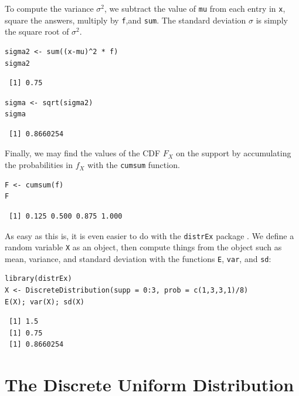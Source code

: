 \documentclass[captions=tableheading]{scrbook}
\begin{document}
To compute the variance \(\sigma^{2}\), we subtract the value of \texttt{mu} from each entry in \texttt{x}, square the answers, multiply by \texttt{f},and \texttt{sum}. The standard deviation \(\sigma\) is simply the square root of \(\sigma^{2}\).


\begin{verbatim}
sigma2 <- sum((x-mu)^2 * f)
sigma2
\end{verbatim}

\begin{verbatim}
 [1] 0.75
\end{verbatim}


\begin{verbatim}
sigma <- sqrt(sigma2)
sigma
\end{verbatim}

\begin{verbatim}
 [1] 0.8660254
\end{verbatim}

Finally, we may find the values of the CDF \(F_{X}\) on the support by accumulating the probabilities in \(f_{X}\) with the \texttt{cumsum} function. 


\begin{verbatim}
F <- cumsum(f)
F
\end{verbatim}

\begin{verbatim}
 [1] 0.125 0.500 0.875 1.000
\end{verbatim}

As easy as this is, it is even easier to do with the \texttt{distrEx} package \cite{Ruckdescheldistr}. We define a random variable \texttt{X} as an object, then compute things from the object such as mean, variance, and standard deviation with the functions \texttt{E}, \texttt{var}, and \texttt{sd}:


\begin{verbatim}
library(distrEx)
X <- DiscreteDistribution(supp = 0:3, prob = c(1,3,3,1)/8)
E(X); var(X); sd(X)
\end{verbatim}

\begin{verbatim}
 [1] 1.5
 [1] 0.75
 [1] 0.8660254
\end{verbatim}
\section{The Discrete Uniform Distribution}
\label{sec-5-2}

\label{sec:disc-uniform-dist}
\end{document}
